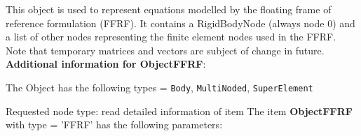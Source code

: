 %
\newpage

\label{sec:item:ObjectFFRF}
This object is used to represent equations modelled by the floating frame of reference formulation (FFRF). It contains a RigidBodyNode (always node 0) and a list of other nodes representing the finite element nodes used in the FFRF. Note that temporary matrices and vectors are subject of change in future.\vspace{12pt}
 \\{\bf Additional information for ObjectFFRF}:
\bi
  \item The Object has the following types = \texttt{Body}, \texttt{MultiNoded}, \texttt{SuperElement}
  \item Requested node type: read detailed information of item
\ei
\vspace{12pt} \noindent The item {\bf ObjectFFRF} with type = 'FFRF' has the following parameters:\vspace{-1cm}\\ 
